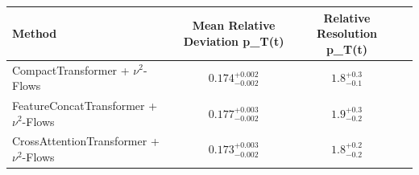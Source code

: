     \begin{tabular}{lccc}
        \toprule
        Method & Mean Relative Deviation p_{T}(t) & Relative Resolution p_{T}(t) \\
        \midrule
        CompactTransformer + $\nu^2$-Flows & $0.174_{-0.002}^{+0.002}$ & $1.8_{-0.1}^{+0.3}$ \\
        FeatureConcatTransformer + $\nu^2$-Flows & $0.177_{-0.002}^{+0.003}$ & $1.9_{-0.2}^{+0.3}$ \\
        CrossAttentionTransformer + $\nu^2$-Flows & $0.173_{-0.002}^{+0.003}$ & $1.8_{-0.2}^{+0.2}$ \\
        \bottomrule
    \end{tabular}